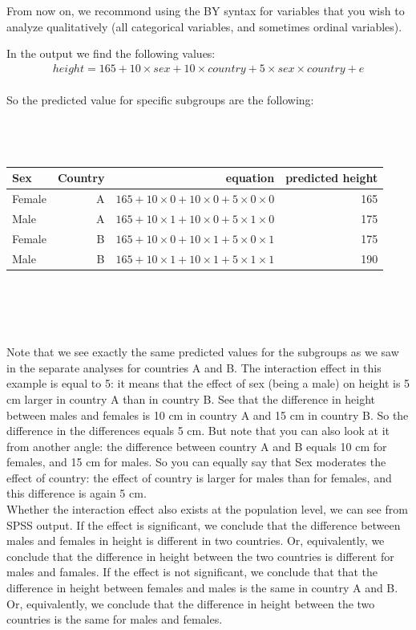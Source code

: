 \documentclass[]{report}\usepackage[]{graphicx}\usepackage[]{color}
\begin{document}
From now on, we recommond using the BY syntax for variables that you wish to analyze qualitatively (all categorical variables, and sometimes ordinal variables).


In the output we find the following values:
\\
\begin{eqnarray} 
height = 165 + 10  \times sex + 10 \times country +  5 \times sex \times country + e \nonumber
\end{eqnarray}
\\
So the predicted value for specific subgroups are the following:
\\
 \\
 \\
 \\
 \begin{tabular}{lrrr}
 Sex & Country & equation & predicted height\\ \hline
 Female & A & $165+10  \times 0 + 10 \times 0 +  5 \times 0 \times 0 $ & 165\\
 Male & A & $165+10  \times 1 + 10 \times 0 +  5 \times 1 \times 0 $ & 175\\
 Female & B & $165+10  \times 0 + 10 \times 1 +  5 \times 0 \times 1 $ & 175\\
 Male & B & $165+10  \times 1 + 10 \times 1 +  5 \times 1 \times 1 $ & 190\\
 \end{tabular}
\\
\\
\\
 \\
Note that we see exactly the same predicted values for the subgroups as we saw in the separate analyses for countries A and B. The interaction effect in this example is equal to 5: it means that the effect of sex (being a male) on height is 5 cm larger in country A than in country B. See that the difference in height between males and females is 10 cm in country A and 15 cm in country B. So the difference in the differences equals 5 cm. But note that you can also look at it from another angle: the difference between country A and B equals 10 cm for females, and 15 cm for males. So you can equally say that Sex moderates the effect of country: the effect of country is larger for males than for females, and this difference is again 5 cm. \\
Whether the interaction effect also exists at the population level, we can see from SPSS output. If the effect is significant, we conclude that the difference between males and females in height is different in two countries. Or, equivalently, we conclude that the difference in height between the two countries is different for males and famales. If the effect is not significant, we conclude that that the difference in height between females and males is the same in country A and B. Or, equivalently, we conclude that the difference in height between the two countries is the same for males and females.
\end{document}
